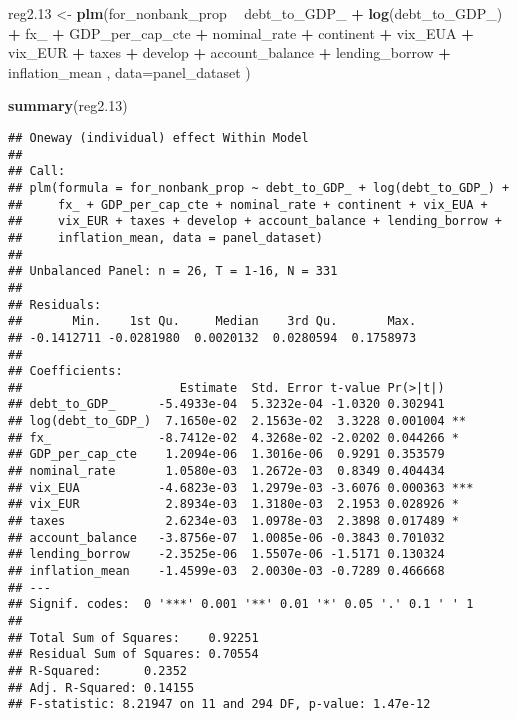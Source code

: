 \documentclass[]{article}
\newenvironment{Shaded}{\begin{snugshade}}{\end{snugshade}}
\newcommand{\KeywordTok}[1]{\textcolor[rgb]{0.13,0.29,0.53}{\textbf{#1}}}
\newcommand{\DataTypeTok}[1]{\textcolor[rgb]{0.13,0.29,0.53}{#1}}
\newcommand{\DecValTok}[1]{\textcolor[rgb]{0.00,0.00,0.81}{#1}}
\newcommand{\StringTok}[1]{\textcolor[rgb]{0.31,0.60,0.02}{#1}}
\newcommand{\OperatorTok}[1]{\textcolor[rgb]{0.81,0.36,0.00}{\textbf{#1}}}
\newcommand{\NormalTok}[1]{#1}
\begin{document}
\begin{Shaded}
\begin{Highlighting}[]
\NormalTok{reg2.}\DecValTok{13}\NormalTok{ <-}\StringTok{ }\KeywordTok{plm}\NormalTok{(for_nonbank_prop }\OperatorTok{~}\StringTok{  }\NormalTok{debt_to_GDP_ }\OperatorTok{+}\StringTok{ }\KeywordTok{log}\NormalTok{(debt_to_GDP_) }\OperatorTok{+}\StringTok{ }\NormalTok{fx_ }\OperatorTok{+}\StringTok{ }\NormalTok{GDP_per_cap_cte }\OperatorTok{+}\StringTok{  }\NormalTok{nominal_rate }\OperatorTok{+}\StringTok{ }\NormalTok{continent }\OperatorTok{+}\StringTok{ }\NormalTok{vix_EUA }\OperatorTok{+}\StringTok{ }\NormalTok{vix_EUR }\OperatorTok{+}\StringTok{ }\NormalTok{taxes }\OperatorTok{+}\StringTok{ }\NormalTok{develop }\OperatorTok{+}\StringTok{ }\NormalTok{account_balance }\OperatorTok{+}\StringTok{ }\NormalTok{lending_borrow }\OperatorTok{+}\StringTok{ }\NormalTok{inflation_mean , }\DataTypeTok{data=}\NormalTok{panel_dataset  )}

\KeywordTok{summary}\NormalTok{(reg2.}\DecValTok{13}\NormalTok{)}
\end{Highlighting}
\end{Shaded}

\begin{verbatim}
## Oneway (individual) effect Within Model
## 
## Call:
## plm(formula = for_nonbank_prop ~ debt_to_GDP_ + log(debt_to_GDP_) + 
##     fx_ + GDP_per_cap_cte + nominal_rate + continent + vix_EUA + 
##     vix_EUR + taxes + develop + account_balance + lending_borrow + 
##     inflation_mean, data = panel_dataset)
## 
## Unbalanced Panel: n = 26, T = 1-16, N = 331
## 
## Residuals:
##       Min.    1st Qu.     Median    3rd Qu.       Max. 
## -0.1412711 -0.0281980  0.0020132  0.0280594  0.1758973 
## 
## Coefficients:
##                      Estimate  Std. Error t-value Pr(>|t|)    
## debt_to_GDP_      -5.4933e-04  5.3232e-04 -1.0320 0.302941    
## log(debt_to_GDP_)  7.1650e-02  2.1563e-02  3.3228 0.001004 ** 
## fx_               -8.7412e-02  4.3268e-02 -2.0202 0.044266 *  
## GDP_per_cap_cte    1.2094e-06  1.3016e-06  0.9291 0.353579    
## nominal_rate       1.0580e-03  1.2672e-03  0.8349 0.404434    
## vix_EUA           -4.6823e-03  1.2979e-03 -3.6076 0.000363 ***
## vix_EUR            2.8934e-03  1.3180e-03  2.1953 0.028926 *  
## taxes              2.6234e-03  1.0978e-03  2.3898 0.017489 *  
## account_balance   -3.8756e-07  1.0085e-06 -0.3843 0.701032    
## lending_borrow    -2.3525e-06  1.5507e-06 -1.5171 0.130324    
## inflation_mean    -1.4599e-03  2.0030e-03 -0.7289 0.466668    
## ---
## Signif. codes:  0 '***' 0.001 '**' 0.01 '*' 0.05 '.' 0.1 ' ' 1
## 
## Total Sum of Squares:    0.92251
## Residual Sum of Squares: 0.70554
## R-Squared:      0.2352
## Adj. R-Squared: 0.14155
## F-statistic: 8.21947 on 11 and 294 DF, p-value: 1.47e-12
\end{verbatim}
\end{document}
